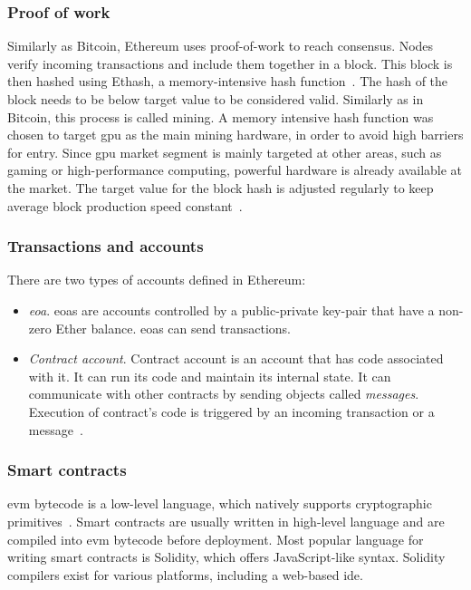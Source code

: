 \subsubsection{Proof of work}
Similarly as Bitcoin, Ethereum uses proof-of-work to reach consensus. Nodes verify incoming transactions and include them together in a block. This block is then hashed using Ethash, a memory-intensive hash function~\cite[p. 211]{Tikhomirov2018Ethereum:Perspectives}. The hash of the block needs to be below target value to be considered valid. Similarly as in Bitcoin, this process is called mining.  A memory intensive hash function was chosen to target \acrshort{gpu} as the main mining hardware, in order to avoid high barriers for entry. Since \acrshort{gpu} market segment is mainly targeted at other areas, such as gaming or high-performance computing, powerful hardware is already available at the market\footnotemark. The target value for the block hash is adjusted regularly to keep average block production speed constant~\cite{Tikhomirov2018Ethereum:Perspectives}.
% 

\subsubsection{Transactions and accounts}
There are two types of accounts defined in Ethereum:
\begin{itemize}[noitemsep]
    \item \textit{\acrfull{eoa}}. \acrshort{eoa}s are accounts controlled by a public-private key-pair that have a non-zero Ether balance. \acrshort{eoa}s can send transactions.~\cite{EthereumCommunityEthereumDocumentation}
    \item \textit{Contract account}. Contract account is an account that has code associated with it. It can run its code and maintain its internal state. It can communicate with other contracts by sending objects called \textit{messages}. Execution of contract's code is triggered by an incoming transaction or a message~\cite{EthereumCommunityEthereumDocumentation}.
\end{itemize}

\subsubsection{Smart contracts}
\acrshort{evm} bytecode is a low-level language, which natively supports cryptographic primitives~\cite{Tikhomirov2018Ethereum:Perspectives}. Smart contracts are usually written in high-level language and are compiled into \acrshort{evm} bytecode before deployment. Most popular language for writing smart contracts is Solidity, which offers JavaScript-like syntax. Solidity compilers exist for various platforms, including a web-based \acrshort{ide}.


